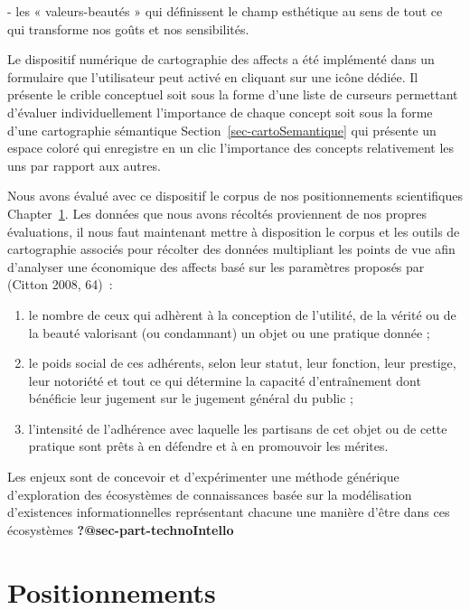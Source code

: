 \documentclass[
  letterpaper,
  DIV=11,
  numbers=noendperiod]{scrreprt}
\providecommand{\tightlist}{%
  \setlength{\itemsep}{0pt}\setlength{\parskip}{0pt}}\usepackage{longtable,booktabs,array}
\begin{document}
- les « valeurs-beautés » qui définissent le champ esthétique au sens de
tout ce qui transforme nos goûts et nos sensibilités.

Le dispositif numérique de cartographie des affects a été implémenté
dans un formulaire que l'utilisateur peut activé en cliquant sur une
icône dédiée. Il présente le crible conceptuel soit sous la forme d'une
liste de curseurs permettant d'évaluer individuellement l'importance de
chaque concept soit sous la forme d'une cartographie sémantique
Section~\ref{sec-cartoSemantique} qui présente un espace coloré qui
enregistre en un clic l'importance des concepts relativement les uns par
rapport aux autres.

Nous avons évalué avec ce dispositif le corpus de nos positionnements
scientifiques Chapter~\ref{sec-positionnements}. Les données que nous
avons récoltés proviennent de nos propres évaluations, il nous faut
maintenant mettre à disposition le corpus et les outils de cartographie
associés pour récolter des données multipliant les points de vue afin
d'analyser une économique des affects basé sur les paramètres proposés
par (Citton 2008, 64)~:

\begin{enumerate}
\def\labelenumi{\alph{enumi})}
\tightlist
\item
  le nombre de ceux qui adhèrent à la conception de l'utilité, de la
  vérité ou de la beauté valorisant (ou condamnant) un objet ou une
  pratique donnée ;
\item
  le poids social de ces adhérents, selon leur statut, leur fonction,
  leur prestige, leur notoriété et tout ce qui détermine la capacité
  d'entraînement dont bénéficie leur jugement sur le jugement général du
  public ;
\item
  l'intensité de l'adhérence avec laquelle les partisans de cet objet ou
  de cette pratique sont prêts à en défendre et à en promouvoir les
  mérites.
\end{enumerate}

Les enjeux sont de concevoir et d'expérimenter une méthode générique
d'exploration des écosystèmes de connaissances basée sur la modélisation
d'existences informationnelles représentant chacune une manière d'être
dans ces écosystèmes \textbf{?@sec-part-technoIntello}

\hypertarget{sec-positionnements}{%
\chapter{Positionnements}\label{sec-positionnements}}
\end{document}

